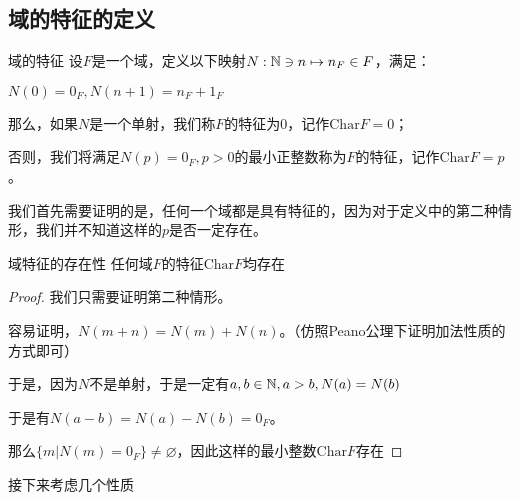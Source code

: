 \documentclass[12pt, a4paper, oneside, UTF8]{ctexbook}
\begin{document}
		\subsection{域的特征的定义}
			\begin{defn}{域的特征}{}
				设$F$是一个域，定义以下映射$N:\mathbb{N} \ni n \mapsto n_F \in F$，满足：
				
				$N(0)=0_F,N(n+1)=n_F+1_F$
				
				那么，如果$N$是一个单射，我们称$F$的特征为$0$，记作$\text{Char} F=0$；
				
				否则，我们将满足$N(p)=0_F,p > 0$的最小正整数称为$F$的特征，记作$\text{Char} F = p$。
			\end{defn}
			我们首先需要证明的是，任何一个域都是具有特征的，因为对于定义中的第二种情形，我们并不知道这样的$p$是否一定存在。
			\begin{them}{域特征的存在性}{}
				任何域$F$的特征$\text{Char} F$均存在
			\end{them}
			\begin{proof}
				我们只需要证明第二种情形。
				
				容易证明，$N(m+n)=N(m)+N(n)$。（仿照Peano公理下证明加法性质的方式即可）
				
				于是，因为$N$不是单射，于是一定有$a,b\in \mathbb{N} ,a > b,N(a)=N(b)$
				
				于是有$N(a-b)=N(a)-N(b)=0_F$。
				
				那么$\{m|N(m)=0_F\}\neq \varnothing$，因此这样的最小整数$\text{Char}F$存在
			\end{proof}
		接下来考虑几个性质
\end{document}
